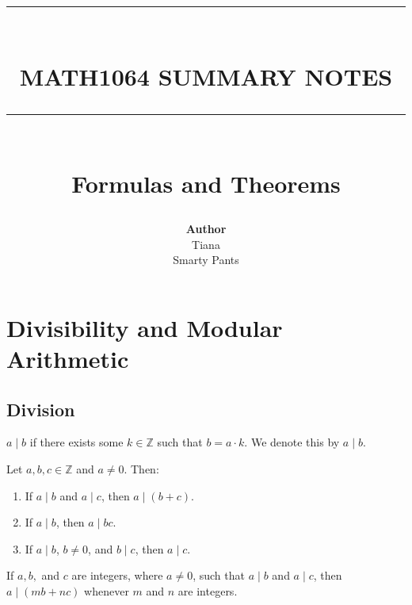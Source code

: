 \documentclass{article}
\newcommand{\HRule}[1]{\rule{\linewidth}{#1}}
\begin{document}

\title{ \normalsize \textsc{}
		\\ [2.0cm]
		\HRule{1.5pt} \\
		\LARGE \textbf{\uppercase{Math1064 Summary Notes}}
		\HRule{2.0pt} \\ [0.6cm] \LARGE{Formulas and Theorems} \vspace*{10\baselineskip}}
\date{}
\author{\textbf{Author} \\ 
		Tiana \\
		Smarty Pants}

\maketitle
\newpage

\tableofcontents
\newpage


\section{Divisibility and Modular Arithmetic}
\subsection{Division}
\begin{principle}
    \( a \mid b \) if there exists some \( k \in \mathbb{Z} \) such that \( b = a \cdot k \). 
    We denote this by \( a \mid b \).
\end{principle}

\begin{theorem}
    Let \( a, b, c \in \mathbb{Z} \) and \( a \neq 0 \). Then:
    \begin{enumerate}
        \item If \( a \mid b \) and \( a \mid c \), then \( a \mid (b + c) \).
        \item If \( a \mid b \), then \( a \mid bc \).
        \item If \( a \mid b \), \( b \neq 0 \), and \( b \mid c \), then \( a \mid c \).
    \end{enumerate}
\end{theorem}

\begin{proposition}
    If \( a, b, \) and \( c \) are integers, where \( a \neq 0 \), such that \( a \mid b \) and \( a \mid c \), then \( a \mid (mb + nc) \) whenever \( m \) and \( n \) are integers.
\end{proposition}
\end{document}
